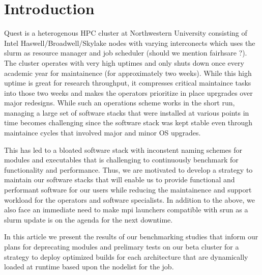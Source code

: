 \documentclass[sigconf,authordraft]{acmart}
\begin{document}


\maketitle

\section{Introduction}

Quest is a heterogenous HPC cluster\cite{quest} at Northwestern University consisting of Intel Haswell/Broadwell/Skylake nodes with varying interconects which uses the slurm\cite{slurm} as resource manager and job scheduler (should we mention fairhsare ?). The cluster operates with very high uptimes and only shuts down once every academic year for maintainence (for approximately two weeks). While this high uptime is great for research throughput, it compresses critical maintaince tasks into those two weeks and makes the operators prioritize in place uprgrades over major redesigns. While such an operations scheme works in the short run, managing a large set of software stacks that were installed at various points in time becomes challenging since the software stack was kept stable even through maintaince cycles that involved major and minor OS upgrades.

This has led to a bloated software stack with inconstent naming schemes for modules and executables that is challenging to continuously benchmark for functionality and performance. Thus, we are motivated to develop a strategy to maintain our software stacks that will enable us to provide functional and performant software for our users while reducing the maintainence and support workload for the operators and software specialists. In addition to the above, we also face an immediate need to make mpi launchers compatible with srun as a slurm update is on the agenda for the next downtime.

In this article we present the results of our benchmarking studies that inform our plans for deprecating modules and prelimary tests on our beta cluster for a strategy to deploy optimized builds for each architecture that are dynamically loaded at runtime based upon the nodelist for the job.
\end{document}
